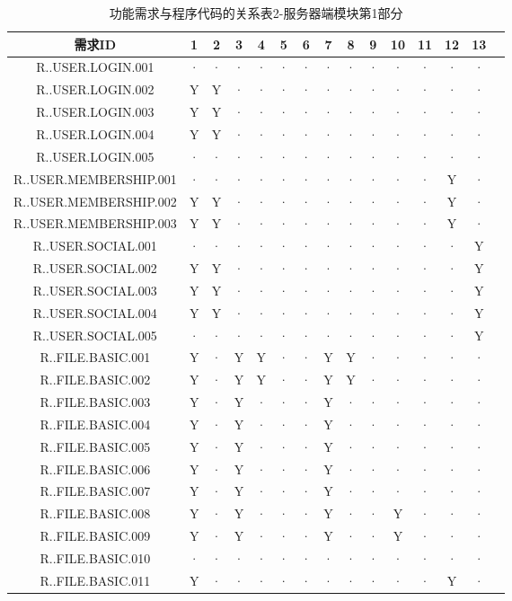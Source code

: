 {\begin{table}[htbp]
        \color{red}
\centering
\caption{功能需求与程序代码的关系表2-服务器端模块第1部分} \label{tab:requirement-module}
\begin{tabular}{|c|c|c|c|c|c|c|c|c|c|c|c|c|c|c|}
    \hline 
    需求ID & 1 & 2 & 3 & 4 & 5 & 6 & 7 & 8 & 9 & 10 & 11 & 12& 13\\    
    \hline 
    R..USER.LOGIN.001 &· &· &· &· &· &· &· &· &· &·  &· &·&·\\
    \hline
    R..USER.LOGIN.002 &Y&Y&· &· &· &· &· &· &· &· &· &·&·\\ 
    \hline 
    R..USER.LOGIN.003 &Y&Y&· &· &· &· &· &· &· &· &· &·&·\\
    \hline
    R..USER.LOGIN.004 &Y&Y&· &· &· &· &· &· &· &· &· &·&·\\
    \hline
    R..USER.LOGIN.005 &· &· &· &· &· &· &· &· &· &· &· &·&·\\
    \hline
    R..USER.MEMBERSHIP.001 &· &· &· &· &· &· &· &· &· &· &· &Y&·\\
    \hline
    R..USER.MEMBERSHIP.002 &Y&Y&· &· &· &· &· &· &· &· &· &Y&·\\ 
    \hline 
    R..USER.MEMBERSHIP.003 &Y&Y&· &· &· &· &· &· &· &· &· &Y&·\\
    \hline
    R..USER.SOCIAL.001 &· &· &· &· &· &· &· &· &· &· &· &·&Y\\
    \hline
    R..USER.SOCIAL.002 &Y&Y&· &· &· &· &· &· &· &· &· &·&Y\\ 
    \hline 
    R..USER.SOCIAL.003 &Y&Y&· &· &· &· &· &· &· &· &· &·&Y\\
    \hline
    R..USER.SOCIAL.004 &Y&Y&· &· &· &· &· &· &· &· &· &·&Y\\
    \hline
    R..USER.SOCIAL.005 &· &· &· &· &· &· &· &· &· &· &· &·&Y\\
    \hline
    R..FILE.BASIC.001 &Y&· &Y&Y&· &· &Y&Y&· &· &· &·&·\\
    \hline
    R..FILE.BASIC.002 &Y&· &Y&Y&· &· &Y&Y&· &· &· &·&·\\
    \hline  
    R..FILE.BASIC.003 &Y&· &Y&· &· &· &Y&· &· &· &· &·&·\\
    \hline
    R..FILE.BASIC.004 &Y&· &Y&· &· &· &Y&· &· &· &· &·&·\\
    \hline
    R..FILE.BASIC.005 &Y&· &Y&· &· &· &Y&· &· &· &· &·&·\\
    \hline
    R..FILE.BASIC.006 &Y&· &Y&· &· &· &Y&· &· &· &· &·&·\\ 
    \hline
    R..FILE.BASIC.007 &Y&· &Y&· &· &· &Y&· &· &· &· &·&·\\
    \hline
    R..FILE.BASIC.008 &Y&· &Y&· &· &· &Y&· &· &Y&· &·&·\\
    \hline
    R..FILE.BASIC.009 &Y&· &Y&· &· &· &Y&· &· &Y&· &·&·\\ 
    \hline
    R..FILE.BASIC.010 &· &· &· &· &· &· &· &· &· &· &· &·&·\\ 
    \hline
    R..FILE.BASIC.011 &Y &· &· &· &· &· &· &· &· &· &· &Y&·\\ 
    \hline


\end{tabular}
\end{table}}
